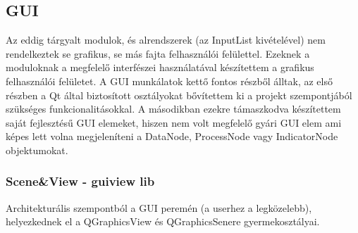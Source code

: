\documentclass[a4paper,12pt,oneside]{report}
\begin{document}
\subsection{GUI}
Az eddig tárgyalt modulok, és alrendszerek (az InputList kivételével) nem rendelkeztek se grafikus, se más fajta felhasználói felülettel. Ezeknek a moduloknak a megfelelő interfészei használatával készítettem a grafikus felhasználói felületet. A GUI munkálatok kettő fontos részből álltak, az első részben a Qt által biztosított osztályokat bővítettem ki a projekt szempontjából szükséges funkcionalitásokkal. A másodikban ezekre támaszkodva készítettem saját fejlesztésű GUI elemeket, hiszen nem volt megfelelő gyári GUI elem ami képes lett volna megjeleníteni a DataNode, ProcessNode vagy IndicatorNode objektumokat.
\subsubsection{Scene\&View - guiview lib}
Architekturális szempontból a GUI peremén (a userhez a legközelebb), helyezkednek el a QGraphicsView és QGraphicsSenere gyermekosztályai.
\end{document}
